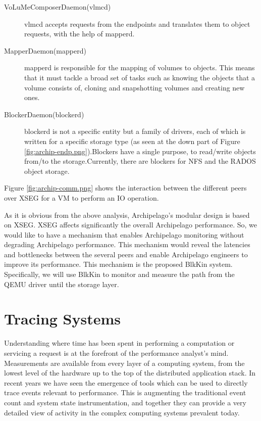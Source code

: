 \begin{description}

\item[VoLuMeComposerDaemon(vlmcd)]
vlmcd accepts requests from the endpoints and translates them to object
requests, with the help of mapperd.

\item[MapperDaemon(mapperd)]
mapperd is responsible for the mapping of volumes to objects. This means that it
must tackle a broad set of tasks such as knowing the objects that a volume
consists of, cloning and snapshotting volumes and creating new ones.

\item[BlockerDaemon(blockerd)]
blockerd is not a specific entity but a family of drivers, each of which is
written for a specific storage type (as seen at the down part of Figure
\ref{fig:archip-endp.png}).Blockers have a single purpose, to read/write objects
from/to the storage.Currently, there are blockers for NFS and the RADOS object
storage.

\end{description} 

Figure \ref{fig:archip-comm.png} shows the interaction between the different
peers over XSEG for a VM to perform an IO operation.


As it is obvious from the above analysis, Archipelago's modular design is based
on XSEG. XSEG affects significantly the overall Archipelago performance. So, we
would like to have a mechanism that enables Archipelago monitoring without
degrading Archipelago performance. This mechanism would reveal the latencies and
bottlenecks between the several peers and enable Archipelago engineers to
improve its performance. This mechanism is the proposed BlkKin system.
Specifically, we will use BlkKin to monitor and measure the path from the QEMU
driver until the storage layer.

\section{Tracing Systems}\label{sec:tracing-bkg}
Understanding where time has been spent in performing a computation or servicing
a request is at the forefront of the performance analyst’s mind. Measurements
are available from every layer of a computing system, from the lowest level of
the hardware up to the top of the distributed application stack. In recent years
we have seen the emergence of tools which can be used to directly trace events
relevant to performance. This is augmenting the traditional event count and
system state instrumentation, and together they can provide a very detailed view
of activity in the complex computing systems prevalent today.

